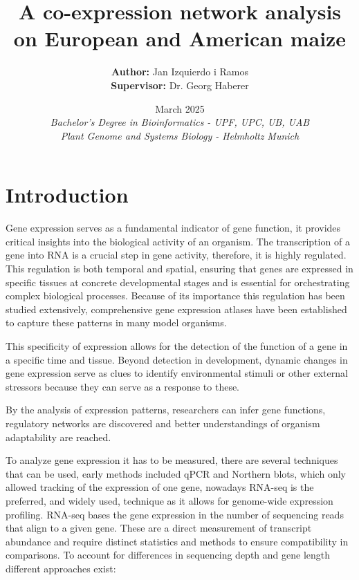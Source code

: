 \documentclass[
]{article}
\title{\protect\hypertarget{_heading=h.monioe1wkcaf}{}{}\textbf{A co-expression network
analysis on European and American maize}}
\author{\textbf{Author:} Jan Izquierdo i Ramos\\
	\textbf{Supervisor:} Dr. Georg Haberer}%
\date{March 2025\\ %
\small \textit{Bachelor's Degree in Bioinformatics - UPF, UPC, UB, UAB\\ %
Plant Genome and Systems Biology - Helmholtz Munich}
}
\begin{document}
\maketitle

\hypertarget{introduction}{%
\section{Introduction}\label{introduction}}


Gene expression serves as a fundamental indicator of gene function, it
provides critical insights into the biological activity of an organism.
The transcription of a gene into RNA is a crucial step in gene activity,
therefore, it is highly regulated. This regulation is both temporal and
spatial, ensuring that genes are expressed in specific tissues at
concrete developmental stages and is essential for orchestrating complex
biological processes. Because of its importance this regulation has been
studied extensively, comprehensive gene expression atlases have been
established to capture these patterns in many model organisms.

This specificity of expression allows for the detection of the function
of a gene in a specific time and tissue. Beyond detection in
development, dynamic changes in gene expression serve as clues to
identify environmental stimuli or other external stressors because they
can serve as a response to these.

By the analysis of expression patterns, researchers can infer gene
functions, regulatory networks are discovered and better understandings
of organism adaptability are reached.

To analyze gene expression it has to be measured, there are several
techniques that can be used, early methods included qPCR and Northern
blots, which only allowed tracking of the expression of one gene,
nowadays RNA-seq is the preferred, and widely used, technique as it
allows for genome-wide expression profiling. RNA-seq bases the gene
expression in the number of sequencing reads that align to a given gene.
These are a direct measurement of transcript abundance and require
distinct statistics and methods to ensure compatibility in comparisons.
To account for differences in sequencing depth and gene length different
approaches exist:
\end{document}
